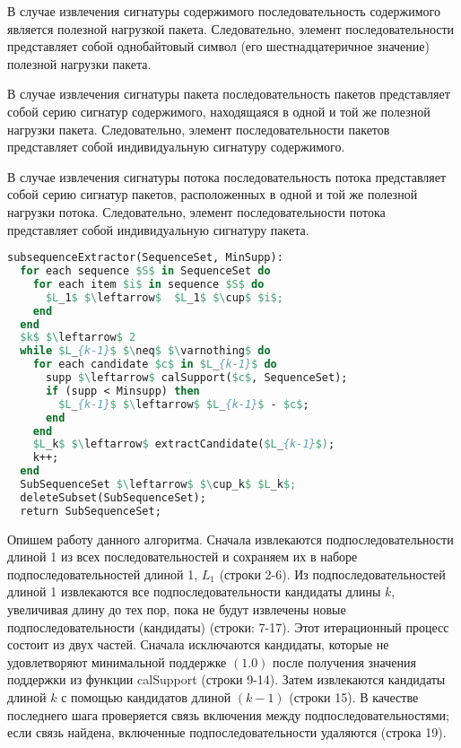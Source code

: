 В случае извлечения сигнатуры содержимого последовательность содержимого является полезной нагрузкой пакета.
Следовательно, элемент последовательности представляет собой однобайтовый символ (его шестнадцатеричное значение) полезной нагрузки пакета.

В случае извлечения сигнатуры пакета последовательность пакетов представляет собой серию сигнатур содержимого, находящаяся в одной и той же полезной нагрузки пакета.
Следовательно, элемент последовательности пакетов представляет собой индивидуальную сигнатуру содержимого.

В случае извлечения сигнатуры потока последовательность потока представляет собой серию сигнатур пакетов, расположенных в одной и той же полезной нагрузки потока.
Следовательно, элемент последовательности потока представляет собой индивидуальную сигнатуру пакета.


\begin{lstlisting}[language=Pascal, caption=Алгоритм выделения подпоследовательности, mathescape]
subsequenceExtractor(SequenceSet, MinSupp):
  for each sequence $S$ in SequenceSet do
    for each item $i$ in sequence $S$ do
      $L_1$ $\leftarrow$  $L_1$ $\cup$ $i$;
    end
  end
  $k$ $\leftarrow$ 2
  while $L_{k-1}$ $\neq$ $\varnothing$ do
    for each candidate $c$ in $L_{k-1}$ do
      supp $\leftarrow$ calSupport($c$, SequenceSet);
      if (supp < Minsupp) then
        $L_{k-1}$ $\leftarrow$ $L_{k-1}$ - $c$;
      end
    end
    $L_k$ $\leftarrow$ extractCandidate($L_{k-1}$);
    k++;
  end
  SubSequenceSet $\leftarrow$ $\cup_k$ $L_k$;
  deleteSubset(SubSequenceSet);
  return SubSequenceSet;
\end{lstlisting}

Опишем работу данного алгоритма.
Сначала извлекаются подпоследовательности длиной 1 из всех последовательностей и сохраняем их в наборе подпоследовательностей длиной 1, $L_1$ (строки 2-6).
Из подпоследовательностей длиной 1 извлекаются все подпоследовательности кандидаты длины $k$,
увеличивая длину до тех пор, пока не будут извлечены новые подпоследовательности (кандидаты) (строки: 7-17).
Этот итерационный процесс состоит из двух частей.
Сначала исключаются кандидаты, которые не удовлетворяют минимальной поддержке $(1.0)$ после получения значения поддержки из функции calSupport (строки 9-14).
Затем извлекаются кандидаты длиной $k$ с помощью кандидатов длиной $(k-1)$ (строки 15).
В качестве последнего шага проверяется связь включения между подпоследовательностями; если связь найдена, включенные подпоследовательности удаляются (строка 19).

